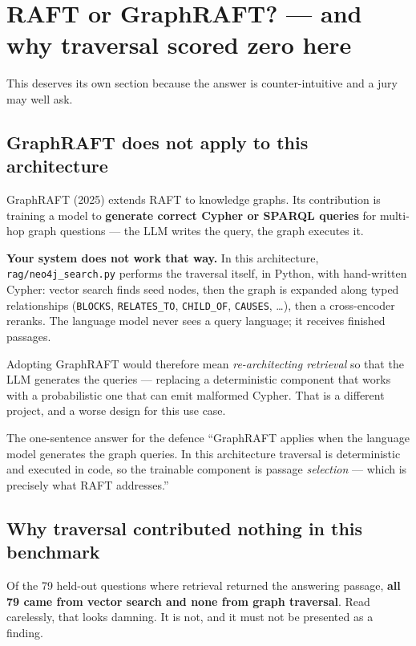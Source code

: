 \documentclass[11pt,a4paper]{article}
\begin{document}
\section{RAFT or GraphRAFT? --- and why traversal scored zero here}

This deserves its own section because the answer is counter-intuitive and a jury
may well ask.

\subsection{GraphRAFT does not apply to this architecture}

GraphRAFT (2025) extends RAFT to knowledge graphs. Its contribution is training a
model to \textbf{generate correct Cypher or SPARQL queries} for multi-hop graph
questions --- the LLM writes the query, the graph executes it.

\textbf{Your system does not work that way.} In this architecture,
\texttt{rag/neo4j\_search.py} performs the traversal itself, in Python, with
hand-written Cypher: vector search finds seed nodes, then the graph is expanded
along typed relationships (\texttt{BLOCKS}, \texttt{RELATES\_TO},
\texttt{CHILD\_OF}, \texttt{CAUSES}, \dots), then a cross-encoder reranks. The
language model never sees a query language; it receives finished passages.

Adopting GraphRAFT would therefore mean \emph{re-architecting retrieval} so that
the LLM generates the queries --- replacing a deterministic component that works
with a probabilistic one that can emit malformed Cypher. That is a different
project, and a worse design for this use case.

\begin{keybox}{{The one-sentence answer for the defence}}
``GraphRAFT applies when the language model generates the graph queries. In this
architecture traversal is deterministic and executed in code, so the trainable
component is passage \emph{selection} --- which is precisely what RAFT addresses.''
\end{keybox}

\subsection{Why traversal contributed nothing in this benchmark}

Of the 79 held-out questions where retrieval returned the answering passage,
\textbf{all 79 came from vector search and none from graph traversal}. Read
carelessly, that looks damning. It is not, and it must not be presented as a
finding.
\end{document}
